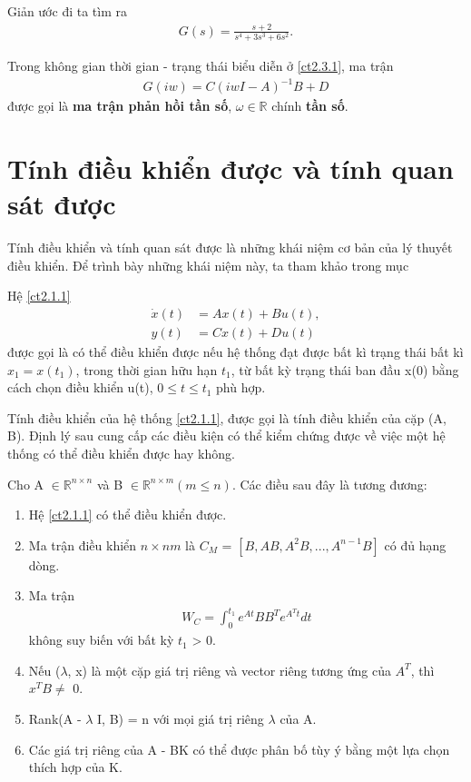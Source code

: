 Giản ước đi ta tìm ra 
\begin{align}
    G(s) = \frac{s + 2}{s^4 + 3s^3 + 6s^2}.\nonumber
\end{align}
\begin{definition}
Trong không gian thời gian - trạng thái biểu diễn ở \eqref{ct2.3.1}, ma trận
\begin{align}
    G(iw) = C(iwI - A)^{-1}B + D
\end{align}
được gọi là \textbf{ma trận phản hồi tần số}, $\omega \in \mathbb{R}$ chính \textbf{tần số}.
\end{definition}

\section{Tính điều khiển được và tính quan sát được}
Tính điều khiển và tính quan sát được là những khái niệm cơ bản của lý thuyết điều khiển. Để trình bày những khái niệm này, ta tham khảo trong mục \cite{5}
\begin{definition}
Hệ \eqref{ct2.1.1} 
\begin{align*}
    \dot{x}(t) &= Ax(t) + Bu(t),\\
    y(t) &= Cx(t) + Du(t)
\end{align*}
được gọi là có thể điều khiển được nếu hệ thống đạt được bất kì trạng thái bất kì $x_1 = x(t_1)$, trong thời gian hữu hạn $t_1$, từ bất kỳ trạng thái ban đầu x(0) bằng cách chọn điều khiển u(t), $0 \leq t \leq t_1$ phù hợp.
\end{definition}
Tính điều khiển của hệ thống \eqref{ct2.1.1}, được gọi là tính điều khiển của cặp (A, B). Định lý sau cung cấp các điều kiện có thể kiểm chứng được về việc một hệ thống có thể điều khiển được hay không.
\begin{theorem}\label{dly2.4.1}
Cho A  $\in \mathbb{R}^{n\times n}$  và  B  $\in \mathbb{R}^{n\times m}(m \leq n).$ Các điều sau đây là tương đương:
 \renewcommand{\theenumiii}{\roman{enumii}}
 \begin{enumerate}
    \item Hệ \eqref{ct2.1.1} có thể điều khiển được.
    \item Ma trận điều khiển $n \times nm$ là $C_M$ = $[B, AB, A^2B,...,A^{n-1}B]$ có đủ hạng dòng.
    \item Ma trận
    \begin{align*}
        W_C = \int_{0}^{t_1}e^{At}BB^{T}e^{A^{T}t}dt
    \end{align*}
không suy biến với bất kỳ $t_1$ > 0.
    \item Nếu ($\lambda$, x) là một cặp giá trị riêng và vector riêng tương ứng của $A^{T}$, thì $x^{T}B \ne$ 0.
    \item Rank(A - $\lambda$ I, B) = n với mọi giá trị riêng $\lambda$ của A.
    \item Các giá trị riêng của A - BK có thể được phân bố tùy ý bằng một lựa chọn thích hợp của K.
 \end{enumerate}
\end{theorem}
